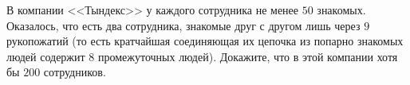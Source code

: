 \documentclass{article}
\begin{document}
В компании <<Тындекс>> у каждого сотрудника не менее $50$ знакомых. Оказалось, что есть два сотрудника,
знакомые друг с другом лишь через $9$ рукопожатий (то есть кратчайшая соединяющая их цепочка из попарно знакомых людей содержит 
$8$ промежуточных людей). Докажите, что в этой компании хотя бы $200$ сотрудников.
\end{document}
